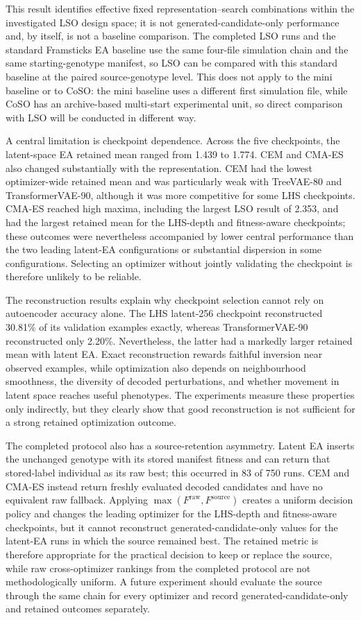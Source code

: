 This result identifies effective fixed representation--search combinations within the investigated LSO design space; it is not generated-candidate-only performance and, by itself, is not a baseline comparison. The completed LSO runs and the standard Framsticks EA baseline use the same four-file simulation chain and the same starting-genotype manifest, so LSO can be compared with this standard baseline at the paired source-genotype level. This does not apply to the mini baseline or to CoSO: the mini baseline uses a different first simulation file, while CoSO has an archive-based multi-start experimental unit, so direct comparison with LSO will be conducted in different way.

A central limitation is checkpoint dependence. Across the five checkpoints, the latent-space EA retained mean ranged from 1.439 to 1.774. CEM and CMA-ES also changed substantially with the representation. CEM had the lowest optimizer-wide retained mean and was particularly weak with TreeVAE-80 and TransformerVAE-90, although it was more competitive for some LHS checkpoints. CMA-ES reached high maxima, including the largest LSO result of 2.353, and had the largest retained mean for the LHS-depth and fitness-aware checkpoints; these outcomes were nevertheless accompanied by lower central performance than the two leading latent-EA configurations or substantial dispersion in some configurations. Selecting an optimizer without jointly validating the checkpoint is therefore unlikely to be reliable.

The reconstruction results explain why checkpoint selection cannot rely on autoencoder accuracy alone. The LHS latent-256 checkpoint reconstructed 30.81\% of its validation examples exactly, whereas TransformerVAE-90 reconstructed only 2.20\%. Nevertheless, the latter had a markedly larger retained mean with latent EA. Exact reconstruction rewards faithful inversion near observed examples, while optimization also depends on neighbourhood smoothness, the diversity of decoded perturbations, and whether movement in latent space reaches useful phenotypes. The experiments measure these properties only indirectly, but they clearly show that good reconstruction is not sufficient for a strong retained optimization outcome.

The completed protocol also has a source-retention asymmetry. Latent EA inserts the unchanged genotype with its stored manifest fitness and can return that stored-label individual as its raw best; this occurred in 83 of 750 runs. CEM and CMA-ES instead return freshly evaluated decoded candidates and have no equivalent raw fallback. Applying $\max(F^{\mathrm{raw}},F^{\mathrm{source}})$ creates a uniform decision policy and changes the leading optimizer for the LHS-depth and fitness-aware checkpoints, but it cannot reconstruct generated-candidate-only values for the latent-EA runs in which the source remained best. The retained metric is therefore appropriate for the practical decision to keep or replace the source, while raw cross-optimizer rankings from the completed protocol are not methodologically uniform. A future experiment should evaluate the source through the same chain for every optimizer and record generated-candidate-only and retained outcomes separately.

